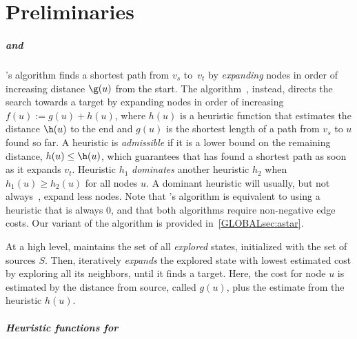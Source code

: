 \chapter*{Preliminaries}

%

\paragraph{\dijkstra and \A}
\dijkstra's algorithm \citep{dijkstra1959note} finds a shortest path from $v_s$
to~$v_t$ by \emph{expanding} nodes in order of increasing distance $\g(u)$
from the start. The \A algorithm~\citep{hart1968formal,pearl1984heuristics},
instead, directs the search towards a target by expanding nodes in order of
increasing ${f(u) := g(u) + h(u)}$, where $h(u)$ is a heuristic function that
estimates the distance $\h(u)$ to the end and $g(u)$ is the shortest length of a
path from $v_s$ to $u$ found so far. A heuristic is \emph{admissible} if it is a
lower bound on the remaining distance, $h(u) \leq \h(u)$, which guarantees that
\A has found a shortest path as soon as it expands $v_t$. Heuristic $h_1$
\emph{dominates} another heuristic $h_2$ when $h_1(u) \ge h_2(u)$ for all nodes $u$.
A dominant heuristic will usually, but not always~\citep{holte2010common},
expand less nodes. Note that \dijkstra's algorithm is
equivalent to \A using a heuristic that is always $0$, and that both algorithms
require non-negative edge costs. Our variant of the \A algorithm is provided
in~\cref{GLOBALsec:astar}.

At a high level, \A maintains the set of all \emph{explored} states, initialized
with the set of sources $S$. Then, \A iteratively \emph{expands} the explored
state with lowest estimated cost by exploring all its neighbors, until it finds
a target. Here, the cost for node $u$ is estimated by the distance from source,
called $g(u)$, plus the estimate from the heuristic $h(u)$.

\paragraph{Heuristic functions for \A}


